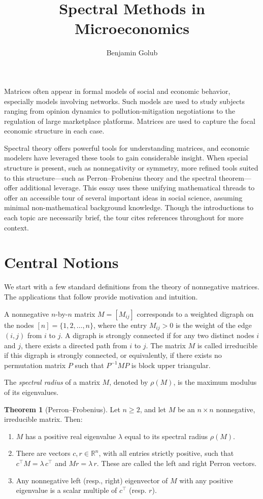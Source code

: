 \documentclass{notices}
\title{
Spectral Methods in Microeconomics
}
\author{
  Benjamin Golub
  \affil{
    The  author is a professor of economics and computer science at Northwestern. His email address is bgolub@northwestern.edu.
    }
}
\theoremstyle{definition}\newtheorem{problem}{Problem}
\theoremstyle{definition} \newtheorem{remark}{Remark}
\theoremstyle{definition} \newtheorem{claim}{Claim}
\theoremstyle{definition} \newtheorem{thm}{Theorem}
\theoremstyle{definition} \newtheorem*{thmNoNum}{Theorem}
\theoremstyle{definition} \newtheorem{definition}{Definition}
\theoremstyle{definition} \theoremstyle{remark}
\theoremstyle{definition} \newtheorem{note}{Note}
\theoremstyle{definition} \newtheorem{notation}{Notation}
\theoremstyle{definition} \theoremstyle{plain}
\theoremstyle{definition} \newtheorem{condition}{Condition}
\theoremstyle{definition} \newtheorem{lem}{Lemma}
\theoremstyle{definition} \newtheorem{corollary}{Corollary}
\theoremstyle{definition} \newtheorem{prop}{Proposition}
\theoremstyle{definition} \newtheorem{ax}{Axiom}
\theoremstyle{definition} \newtheorem{assumption}{Assumption}
\theoremstyle{definition} \newtheorem{example}{Example}
\theoremstyle{definition} \newtheorem{rmk}{Remark}
\theoremstyle{definition} \newtheorem{res}{Result}
\theoremstyle{definition} \newtheorem{que}{Question}
\theoremstyle{definition} \newtheorem{conjecture}{Conjecture}
\theoremstyle{definition}
\begin{document}
\maketitle

Matrices often appear in formal models of social and economic behavior, especially models involving networks. Such models are used to study subjects ranging from opinion dynamics to pollution-mitigation negotiations to the regulation of large marketplace platforms. Matrices are used to capture the focal economic structure in each case.

Spectral theory offers powerful tools for understanding matrices, and economic modelers have leveraged these tools to gain considerable insight. When special structure is present, such as nonnegativity or symmetry, more refined tools suited to this structure---such as Perron--Frobenius theory and the spectral theorem---offer additional leverage. This essay uses these unifying mathematical threads to offer an accessible tour of several important ideas in social science, assuming minimal non-mathematical background knowledge. Though the introductions to each topic are necessarily brief, the tour cites references throughout for more context.



\section*{Central Notions}

We start with a few standard definitions from the theory of nonnegative matrices. The applications that follow provide motivation and intuition.

A nonnegative $n$-by-$n$ matrix $M=[M_{ij}]$ corresponds to a weighted digraph on the nodes \([n]=\{1,2,\ldots,n\}\), where the entry \(M_{ij} > 0\) is the weight of the edge $(i,j)$ from $i$ to $j$. A digraph is strongly connected if for any two distinct nodes $i$ and $j$, there exists a directed path from $i$ to $j$. The matrix $M$ is called irreducible if this digraph is strongly connected, or equivalently, if there exists no permutation matrix $P$ such that $P^{-1}MP$ is block upper triangular. 


The \emph{spectral radius} of a matrix $M$, denoted by $\rho(M)$, is the maximum modulus of its eigenvalues.

\begin{thmNoNum}[Perron--Frobenius]
Let \(n \ge 2\), and let \(M\) be an \(n\times n\) nonnegative, irreducible matrix. Then:
\begin{enumerate}
    \item \(M\) has a positive real eigenvalue \(\lambda\) equal to its spectral radius \(\rho(M)\).
    \item There are vectors \(c, r \in \mathbb{R}^n\), with all entries strictly positive, such that \(c^\top M = \lambda\,c^\top\) and \(Mr = \lambda\,r\). These are called the left and right Perron vectors.
    \item Any nonnegative left (resp., right) eigenvector of \(M\) with any positive eigenvalue is a scalar multiple of \(c^\top\) (resp. \(r\)).
\end{enumerate}
\end{thmNoNum}
\end{document}
